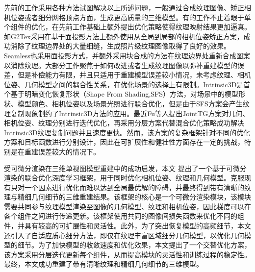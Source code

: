 先前的工作采用各种方法试图解决以上所述问题，一般通过合成纹理图像、矫正相机位姿或者细分网格顶点方面，生成更高质量的三维模型。有的工作不止着眼于单个组件的优化，在先前工作基础上额外提出优化策略使得纹理映射结果更加逼真。如G2Tex采用在基于面投影方法上额外使用从全局到局部的相机位姿矫正方案，成功消除了纹理边界处的大量细缝，生成照片级纹理图像取得了良好的效果。Seamless也采用面投影方式，并额外采用块合成的方法在纹理边界处重新合成图案以消除纹理。大部分工作聚焦于如何改进或者生成纹理图像以弥补重建模型的误差，但是补偿能力有限，并且只适用于重建模型误差较小情况，未考虑纹理、相机位姿、几何模型之间的耦合性关系，在优化场景的选择上有限制。Intrinsic3D是首个基于明暗变化恢复形状（Shape From Shading,SFS）方法，对场景中的模型形状、模型颜色、相机位姿以及场景光照进行联合优化，但是由于SFS方案会产生纹理复制现象制约了Intrinsic3D方法的应用。最近Fu等人提出JointTG方案对几何、相机位姿、纹理分别进行迭代优化，再采用分层方案代替混合优化策略成功解决Intrinsic3D纹理复制问题并且速度更快。然而，该方案的复杂框架针对不同的优化方案和目标函数进行分别设计，因此在可扩展性和健壮性方面存在一定的挑战，特别是在重建误差较大的情况下。\par

受可微分渲染在三维单视图模型重建中的成功启发，本文
提出了一个基于可微分渲染的联合优化深度学习框架，用于同时优化相机位姿、纹理和几何模型。克服现有只对一个因素进行优化而难以达到全局最优解的障碍，并最终得到带有清晰的纹理与精细几何细节的三维重建结果。该框架的核心是一个可微分渲染模块，该模块需要共同参与纹理模型渲染至图像的几何模型、纹理和相机位姿，因此梯度可以在各个组件之间进行传递更新。该框架使用共同的图像间损失函数来优化不同的组件，并具有较高的可扩展性和灵活性。此外，为了突出恢复模型的高频细节，本文还引入了自适应质心细分方法，即仅在纹理丰富区域细分几何模型，以优化几何模型的细节。为了加快模型的收敛速度和优化效果，本文提出了一个交替优化方案，该方案采用分层迭代更新每个组件，从而提高模块的灵活性和训练过程的稳定性。最终，本文成功重建了带有清晰纹理和精细几何细节的三维模型。\par

